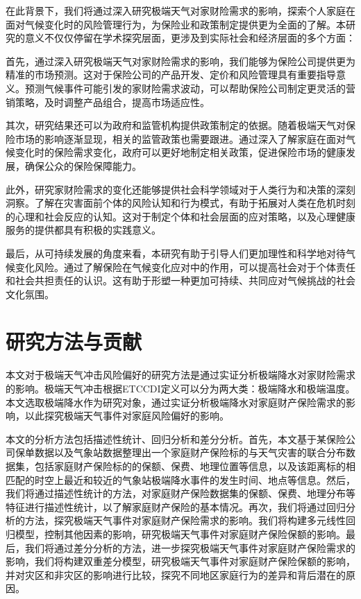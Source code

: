 在此背景下，我们将通过深入研究极端天气对家财险需求的影响，探索个人家庭在面对气候变化时的风险管理行为，为保险业和政策制定提供更为全面的了解。本研究的意义不仅仅停留在学术探究层面，更涉及到实际社会和经济层面的多个方面：

首先，通过深入研究极端天气对家财险需求的影响，我们能够为保险公司提供更为精准的市场预测。这对于保险公司的产品开发、定价和风险管理具有重要指导意义。预测气候事件可能引发的家财险需求波动，可以帮助保险公司制定更灵活的营销策略，及时调整产品组合，提高市场适应性。

其次，研究结果还可以为政府和监管机构提供政策制定的依据。随着极端天气对保险市场的影响逐渐显现，相关的监管政策也需要跟进。通过深入了解家庭在面对气候变化时的保险需求变化，政府可以更好地制定相关政策，促进保险市场的健康发展，确保公众的保险保障能力。

此外，研究家财险需求的变化还能够提供社会科学领域对于人类行为和决策的深刻洞察。了解在灾害面前个体的风险认知和行为模式，有助于拓展对人类在危机时刻的心理和社会反应的认知。这对于制定个体和社会层面的应对策略，以及心理健康服务的提供都具有积极的实践意义。

最后，从可持续发展的角度来看，本研究有助于引导人们更加理性和科学地对待气候变化风险。通过了解保险在气候变化应对中的作用，可以提高社会对于个体责任和社会共担责任的认识。这有助于形塑一种更加可持续、共同应对气候挑战的社会文化氛围。

\section{研究方法与贡献}
本文对于极端天气冲击风险偏好的研究方法是通过实证分析极端降水对家财险需求的影响。极端天气冲击根据ETCCDI\citep{alexander2006global}定义可以分为两大类：极端降水和极端温度。本文选取极端降水作为研究对象，通过实证分析极端降水对家庭财产保险需求的影响，以此探究极端天气事件对家庭风险偏好的影响。

本文的分析方法包括描述性统计、回归分析和差分分析。首先，本文基于某保险公司保单数据以及气象站数据整理出一个家庭财产保险标的与天气灾害的联合分布数据集，包括家庭财产保险标的的保额、保费、地理位置等信息，以及该距离标的相匹配的时空上最近和较近的气象站极端降水事件的发生时间、地点等信息。然后，我们将通过描述性统计的方法，对家庭财产保险数据集的保额、保费、地理分布等特征进行描述性统计，以了解家庭财产保险的基本情况。再次，我们将通过回归分析的方法，探究极端天气事件对家庭财产保险需求的影响。我们将构建多元线性回归模型，控制其他因素的影响，研究极端天气事件对家庭财产保险保额的影响。最后，我们将通过差分分析的方法，进一步探究极端天气事件对家庭财产保险需求的影响，我们将构建双重差分模型，研究极端天气事件对家庭财产保险保额的影响，并对灾区和非灾区的影响进行比较，探究不同地区家庭行为的差异和背后潜在的原因。

